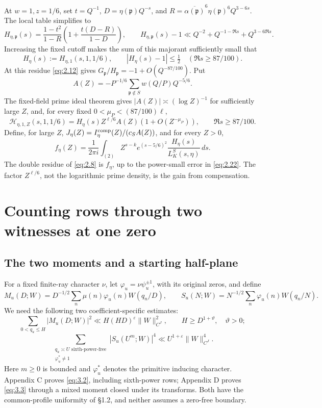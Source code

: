 \documentclass[11pt,a4paper]{article}
\begin{document}
At \(w=1,z=1/6\), set \(t=Q^{-1}\), \(D=\eta(\mathfrak p)Q^{-s}\), and \(R=\overline{\alpha(\mathfrak p)}^6\eta(\mathfrak p)^6Q^{3-6s}\). The local table simplifies to \[
 H_{\eta,\mathfrak p}(s)=\frac{1-t^2}{1-R}
 \left(1+\frac{t(D-R)}{1-D}\right),\qquad
 H_{\eta,\mathfrak p}(s)-1\ll Q^{-2}+Q^{-1-\Re s}+Q^{3-6\Re s}.
\tag{2.19}\label{eq:2.19}
\] Increasing the fixed cutoff makes the sum of this majorant sufficiently small that \[
 H_\eta(s):=H_{\eta,1}(s,1,1/6),\qquad
 |H_\eta(s)-1|\le\tfrac12\quad(\Re s\ge87/100).
\tag{2.20}\label{eq:2.20}
\] At this residue \eqref{eq:2.12} gives \(G_{\mathfrak p}/H_{\mathfrak p}=-1+O(Q^{-87/100})\). Put \[
 A(Z)=-P^{-1/6}\sum_{\mathfrak p\notin S}w(Q/P)Q^{-5/6}.
\tag{2.21}\label{eq:2.21}
\] The fixed-field prime ideal theorem gives \(|A(Z)|\asymp(\log Z)^{-1}\) for sufficiently large \(Z\), and, for every fixed \(0<\mu_P<(87/100)\ell\), \[
 \mathcal H_{\eta,1,Z}(s,1,1/6)
 =H_\eta(s)Z^{\ell/6}A(Z)(1+O(Z^{-\mu_P})),\qquad \Re s\ge87/100.
\tag{2.22}\label{eq:2.22}
\] Define, for large \(Z\), \(J_\eta(Z)=I_\eta^{\rm comp}(Z)/(c_SA(Z))\), and for every \(Z>0\), \[
 f_\eta(Z)=\frac1{2\pi i}\int_{(2)}Z^{s-k}e^{(s-5/6)^2}
 \frac{H_\eta(s)}{L_K^S(s,\eta)}\,ds.
\tag{2.23}\label{eq:2.23}
\] The double residue of \eqref{eq:2.8} is \(f_\eta\), up to the power-small error in \eqref{eq:2.22}. The factor \(Z^{\ell/6}\), not the logarithmic prime density, is the gain from compensation.

\section{Counting rows through two witnesses at one zero}\label{sec:3}

\subsection{The two moments and a starting half-plane}\label{sec:3.1}

For a fixed finite-ray character \(\nu\), let \(\varphi_u=\nu\psi_u^{\pm1}\), with its original zeros, and define \[
 M_u(D;W)=D^{-1/2}\sum_n\mu(n)\varphi_u(n)W(q_n/D),\qquad
 S_u(N;W)=N^{-1/2}\sum_n\varphi_u(n)W(q_n/N).
\tag{3.1}\label{eq:3.1}
\] We need the following two coefficient-specific estimates: \[
 \sum_{0<q_u\le H}|M_u(D;W)|^2\ll H(HD)^\varepsilon\|W\|_{C^J}^2,
 \qquad H\ge D^{1+\vartheta},\quad \vartheta>0;
\tag{3.2}\label{eq:3.2}
\] \[
 \sum_{\substack{q_u\asymp U\text{ sixth-power-free}\\\varphi_u^*\ne1}}
 |S_u(U^m;W)|^4\ll U^{1+\varepsilon}\|W\|_{C^J}^4.
\tag{3.3}\label{eq:3.3}
\] Here \(m\ge0\) is bounded and \(\varphi_u^*\) denotes the primitive inducing character. Appendix C proves \eqref{eq:3.2}, including sixth-power rows; Appendix D proves \eqref{eq:3.3} through a mixed moment closed under its transforms. Both have the common-profile uniformity of §1.2, and neither assumes a zero-free boundary.
\end{document}
